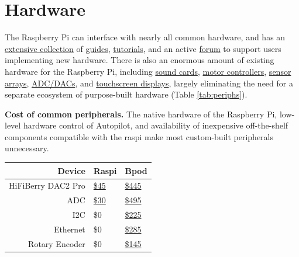 \section{Hardware}
\label{sec:hardware}

The Raspberry Pi can interface with nearly all common hardware, and has an \href{https://www.raspberrypi.org/help/}{extensive collection} of \href{https://elinux.org/RPi_Guides}{guides}, \href{https://elinux.org/RPi_Tutorials}{tutorials}, and an active \href{https://www.raspberrypi.org/forums/}{forum} to support users implementing new hardware. There is also an enormous amount of existing hardware for the Raspberry Pi, including \href{https://www.hifiberry.com/}{sound cards}, \href{https://www.adafruit.com/product/2348}{motor controllers}, \href{https://www.digikey.com/product-detail/en/raspberry-pi/SENSE-HAT/1690-1013-ND/6196429}{sensor arrays}, \href{https://www.seeedstudio.com/Raspberry-Pi-High-Precision-AD-DA-Board-p-2765.html}{ADC/DACs}, and \href{https://www.digikey.com/product-detail/en/pimoroni-ltd/PIM369/1778-1221-ND/9521981}{touchscreen displays}, largely eliminating the need for a separate ecosystem of purpose-built hardware (Table \ref{tab:periphs}). 

\begin{margintable}[-0.75cm]
\caption{
\textbf{Cost of common peripherals.} The native hardware of the Raspberry Pi, low-level hardware control of Autopilot, and availability of inexpensive off-the-shelf components compatible with the raspi make most custom-built peripherals unnecessary.}
\label{tab:periphs}
\noindent\begin{tabularx}{\linewidth}{Rll}
\toprule
\textbf{Device} & Raspi & Bpod \\
\midrule
HiFiBerry DAC2 Pro & \href{https://www.hifiberry.com/shop/boards/hifiberry-dac2-pro/}{\$45} &  \href{https://sanworks.io/shop/viewproduct?productID=1032}{\$445}\\
ADC & \href{https://thepihut.com/products/high-precision-adc-hat-for-raspberry-pi-10-channel-32-bit}{\$30} & \href{https://sanworks.io/shop/viewproduct?productID=1021}{\$495}\\
I2C & \$0 & \href{https://sanworks.io/shop/viewproduct?productID=1019}{\$225} \\
Ethernet & \$0 & \href{https://sanworks.io/shop/viewproduct?productID=1025}{\$285} \\
Rotary Encoder & \$0 &  \href{https://sanworks.io/shop/viewproduct?productID=1022}{\$145}\\
\bottomrule
\end{tabularx}
\end{margintable}

